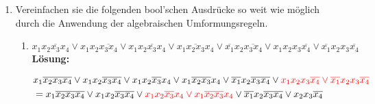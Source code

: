 \documentclass[paper=a4,fontsize=11pt]{scrartcl}%
\numberwithin{equation}{section}
\newenvironment{solution}
	{
		\color{Blue}
		\textbf{Lösung:}
	}{}
\begin{document}
\begin{enumerate}
	\begin{solution}
	\begin{enumerate}
		\item Kommutativegesetz:
		\begin{align*}
		kgV(a,b) &= kgV(b,a)\\
		ggT(a,b) &= ggT(b,a)
		\end{align*}
		\item Distributivgesetz:
		\begin{align*}
		kgV(a, ggT(b,c)) &= ggT(kgV(a,b), kgV(a,c))\\
		ggT(a, kgV(b,c)) &= kgV(ggT(a,b), ggT(a,c))
		\end{align*}
		\item Neutrale Elemente:
		\begin{align*}
		kgV(a,1) &= a\\
		ggT(a,6) &= a
		\end{align*}
		\item Inverse Elemente: Das inverse Element von 1 ist 6 und das inverse Element von 2 ist 3.
		\begin{align*}
		kgV(1,6) &= 6\\
		kgV(2,3) &= 6\\
		ggT(1,6) &= 1\\
		ggT(2,3) &= 1\\
		\end{align*}
	\end{enumerate}
	\end{solution}
	\item Vereinfachen sie die folgenden bool'schen Ausdrücke so weit wie möglich durch die Anwendung der algebraischen Umformungsregeln.
	\begin{enumerate}
		\item $ x_1 \overline{x_2 x_3 x_4} \lor x_1 x_2 \overline{x_3 x_4} \lor x_1 x_2 \overline{x_3} x_4 \lor x_1 \overline{x_2 x_3} x_4 \lor \overline{x_1} x_2 \overline{x_3 x_4} \lor x_1 x_2 x_3 \overline{x_4} \lor \overline{x_1} x_2 x_3 \overline{x_4}$
		\begin{solution}
		\begin{align*}
		& x_1 \overline{x_2 x_3 x_4} \lor x_1 x_2 \overline{x_3 x_4} \lor x_1 x_2 \overline{x_3} x_4 \lor x_1 \overline{x_2 x_3} x_4 \lor \overline{x_1} x_2 \overline{x_3 x_4} \lor \textcolor{red}{ x_1 x_2 x_3 \overline{x_4} \lor \overline{x_1} x_2 x_3 \overline{x_4} } \\
		&= x_1 \overline{x_2} \overline{x_3} \overline{x_4} \lor x_1 x_2 \overline{x_3} \overline{x_4} \lor \textcolor{red}{x_1 x_2 \overline{x_3} x_4 \lor x_1 \overline{x_2} \overline{x_3} x_4 } \lor  \overline{x_1} x_2 \overline{x_3} \overline{x_4} \lor x_2 x_3 \overline{x_4}\\

\end{align*}
\end{solution}
\end{enumerate}
\end{enumerate}
\end{document}
